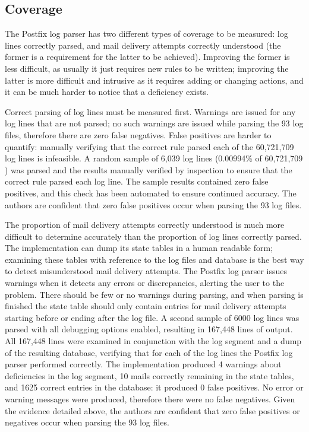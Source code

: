 \documentclass{svmult}
\newcommand{\numberOFlogFILES}[0]{%
    93%
}
\newcommand{\numberOFlogLINES}[0]{%
    60,721,709%
}
\begin{document}
\subsection{Coverage}

\label{coverage}

The Postfix log parser has two different types of coverage to be measured:
log lines correctly parsed, and mail delivery attempts correctly understood
(the former is a requirement for the latter to be achieved).  Improving the
former is less difficult, as usually it just requires new rules to be
written; improving the latter is more difficult and intrusive as it
requires adding or changing actions, and it can be much harder to notice
that a deficiency exists.

Correct parsing of log lines must be measured first.  Warnings are issued
for any log lines that are not parsed; no such warnings are issued while
parsing the \numberOFlogFILES{} log files, therefore
there are zero false negatives.  False positives are harder to
quantify: manually verifying that the correct rule parsed each of the
\numberOFlogLINES{} log lines is infeasible.  A random sample of 6,039 log
lines (0.00994\% of \numberOFlogLINES{}) was parsed and the results
manually verified by inspection to ensure that the correct rule parsed each
log line.  The sample results contained zero false positives, and this
check has been automated to ensure continued accuracy.  The authors are
confident that zero false positives occur when parsing the
\numberOFlogFILES{} log files.

The proportion of mail delivery attempts correctly understood is much more
difficult to determine accurately than the proportion of log lines
correctly parsed.  The implementation can dump its state tables in a human
readable form; examining these tables with reference to the log files and
database is the best way to detect misunderstood mail delivery attempts.
The Postfix log parser issues warnings when it detects any errors or
discrepancies, alerting the user to the problem.  There should be few or no
warnings during parsing, and when parsing is finished the state table
should only contain entries for mail delivery attempts starting before or
ending after the log file.  A second sample of 6000 log lines was parsed
with all debugging options enabled, resulting in 167,448 lines of output.
All 167,448 lines were examined in conjunction with the log segment and a
dump of the resulting database, verifying that for each of the log lines
the Postfix log parser performed correctly.  The implementation produced 4
warnings about deficiencies in the log segment, 10 mails correctly
remaining in the state tables, and 1625 correct entries in the database: it
produced 0 false positives.  No error or warning messages were produced,
therefore there were no false negatives.  Given the evidence detailed
above, the authors are confident that zero false positives or negatives
occur when parsing the \numberOFlogFILES{} log files.
\end{document}
